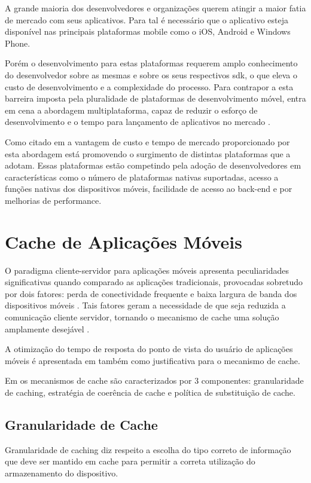 \documentclass[
	article,			%
	11pt,				%
	oneside,			%
	a4paper,			%
	english,			%
	brazil,				%
	sumario=tradicional
]{abntex2}
\begin{document}
A grande maioria dos desenvolvedores e organizações querem atingir a maior fatia de mercado com seus aplicativos. Para tal é necessário que o aplicativo esteja disponível nas principais plataformas mobile como o iOS, Android e Windows Phone. 

Porém o desenvolvimento para estas plataformas requerem amplo conhecimento do desenvolvedor sobre as mesmas e sobre os seus respectivos \gls{sdk}, o que eleva o custo de desenvolvimento e a complexidade do processo. Para contrapor a esta barreira imposta pela pluralidade de plataformas de desenvolvimento móvel, entra em cena a abordagem multiplataforma, capaz de reduzir o esforço de desenvolvimento e o tempo para lançamento de aplicativos no mercado \cite{dalmasso2013survey}.

Como citado em \cite{shehab2014reducing} a vantagem de custo e tempo de mercado proporcionado por esta abordagem está promovendo o surgimento de distintas plataformas que a adotam. Essas plataformas estão competindo pela adoção de desenvolvedores em características como o número de plataformas nativas suportadas, acesso a funções nativas dos dispositivos móveis, facilidade de acesso ao \gls{back-end} e por melhorias de performance. 

\section{Cache de Aplicações Móveis}

O paradigma cliente-servidor para aplicações móveis apresenta peculiaridades significativas quando comparado as aplicações tradicionais, provocadas sobretudo por dois fatores: perda de conectividade frequente e baixa largura de banda dos dispositivos móveis \cite{rathore2007overview}.
Tais fatores geram a necessidade de que seja reduzida a comunicação cliente servidor, tornando o mecanismo de cache uma solução amplamente desejável \cite{rathore2007overview}.

A otimização do tempo de resposta do ponto de vista do usuário de aplicações móveis é apresentada em \cite{xing2015user} também como justificativa para o mecanismo de cache.
 
 Em \cite{rathore2007overview} os mecanismos de cache são caracterizados por 3 componentes: granularidade de caching, estratégia de coerência de cache e política de substituição de cache.

\subsection{Granularidade de Cache}
Granularidade de caching diz respeito a escolha do tipo correto de informação que deve ser mantido em cache para permitir a correta utilização do armazenamento do dispositivo.
\end{document}

